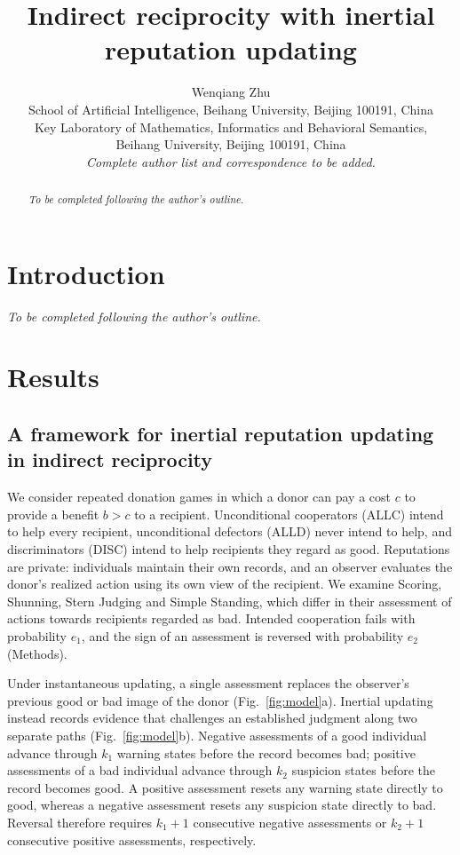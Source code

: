 \documentclass[fleqn,10pt]{article}
\title{Indirect reciprocity with inertial reputation updating}
\author{Wenqiang Zhu\\[0.5em]
\small School of Artificial Intelligence, Beihang University, Beijing 100191, China\\
\small Key Laboratory of Mathematics, Informatics and Behavioral Semantics,\\
\small Beihang University, Beijing 100191, China\\[0.5em]
\small\textit{Complete author list and correspondence to be added.}}
\date{}
\begin{document}
\raggedbottom
\maketitle
\begin{abstract}
\textit{To be completed following the author's outline.}
\end{abstract}
\section*{Introduction}
\textit{To be completed following the author's outline.}
\section*{Results}
\subsection*{A framework for inertial reputation updating in indirect reciprocity}

We consider repeated donation games in which a donor can pay a cost $c$ to provide a benefit $b>c$ to a recipient. Unconditional cooperators (ALLC) intend to help every recipient, unconditional defectors (ALLD) never intend to help, and discriminators (DISC) intend to help recipients they regard as good. Reputations are private: individuals maintain their own records, and an observer evaluates the donor's realized action using its own view of the recipient. We examine Scoring, Shunning, Stern Judging and Simple Standing, which differ in their assessment of actions towards recipients regarded as bad. Intended cooperation fails with probability $e_1$, and the sign of an assessment is reversed with probability $e_2$ (Methods).

Under instantaneous updating, a single assessment replaces the observer's previous good or bad image of the donor (Fig.~\ref{fig:model}a). Inertial updating instead records evidence that challenges an established judgment along two separate paths (Fig.~\ref{fig:model}b). Negative assessments of a good individual advance through $k_1$ warning states before the record becomes bad; positive assessments of a bad individual advance through $k_2$ suspicion states before the record becomes good. A positive assessment resets any warning state directly to good, whereas a negative assessment resets any suspicion state directly to bad. Reversal therefore requires $k_1+1$ consecutive negative assessments or $k_2+1$ consecutive positive assessments, respectively.
\end{document}
